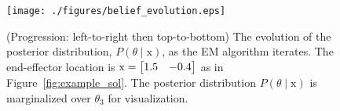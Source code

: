 \begin{figure}[t]
    \centering
	\texttt{[image: ./figures/belief\_evolution.eps]}
    \caption{(Progression: left-to-right then top-to-bottom) The evolution of
    the posterior distribution, $P(\theta \mid \mathrm{x})$, as the EM algorithm
    iterates. The end-effector location is $\mathrm{x} = \begin{bmatrix}1.5 & -0.4\end{bmatrix}$ as
    in Figure~\ref{fig:example_sol}. The posterior distribution $P(\theta \mid
    \mathrm{x})$ is marginalized over $\theta_3$ for visualization.}
    \label{fig:belief_evolution}
\end{figure}